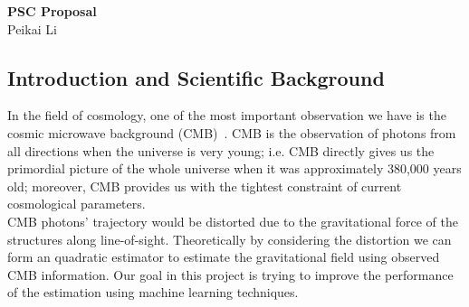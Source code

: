\documentclass[12pt]{article}
\begin{document}
\topmargin=-2.105cm
\oddsidemargin=-0.1cm
\evensidemargin=0cm

\begin{center}
{\bf PSC Proposal\\}
Peikai Li
\end{center}

\begin{small}


\section{Introduction and Scientific Background}
In the field of cosmology, one of the most important observation we have is the cosmic microwave background (CMB)~\cite{Dodelson:2003ft}. CMB is the observation of photons from all directions when the universe is very young; i.e. CMB directly gives us the primordial picture of the whole universe when it was approximately 380,000 years old; moreover, CMB provides us with the tightest constraint of current cosmological parameters. \\
CMB photons' trajectory would be distorted due to the gravitational force of the structures along line-of-sight. Theoretically by considering the distortion we can form an quadratic estimator to estimate the gravitational field using observed CMB information. Our goal in this project is trying to improve the performance of the estimation using machine learning techniques.


\end{small}
\end{document}
